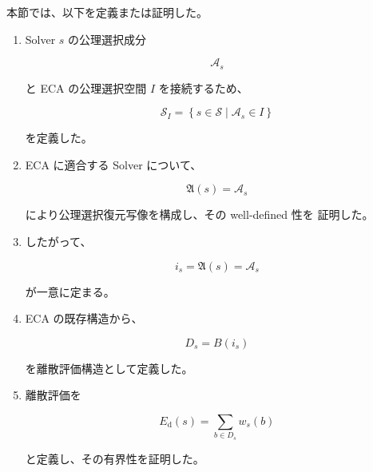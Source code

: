 \documentclass[a4paper,11pt]{article}
\begin{document}
本節では、以下を定義または証明した。

\begin{enumerate}[label=\textup{(\arabic*)}]

    \item
    Solver $s$ の公理選択成分

    \begin{equation}
        \mathcal{A}_s
    \end{equation}

    と ECA の公理選択空間 $I$ を接続するため、

    \begin{equation}
        \mathcal{S}_I
        =
        \left\{
            s\in\mathcal{S}
            \mid
            \mathcal{A}_s\in I
        \right\}
    \end{equation}

    を定義した。

    \item
    ECA に適合する Solver について、

    \begin{equation}
        \mathfrak{A}(s)
        =
        \mathcal{A}_s
    \end{equation}

    により公理選択復元写像を構成し、その well-defined 性を
    証明した。

    \item
    したがって、

    \begin{equation}
        i_s
        =
        \mathfrak{A}(s)
        =
        \mathcal{A}_s
    \end{equation}

    が一意に定まる。

    \item
    ECA の既存構造から、

    \begin{equation}
        D_s
        =
        B(i_s)
    \end{equation}

    を離散評価構造として定義した。

    \item
    離散評価を

    \begin{equation}
        E_{\mathrm d}(s)
        =
        \sum_{b\in D_s}w_s(b)
    \end{equation}

    と定義し、その有界性を証明した。


\end{enumerate}
\end{document}
